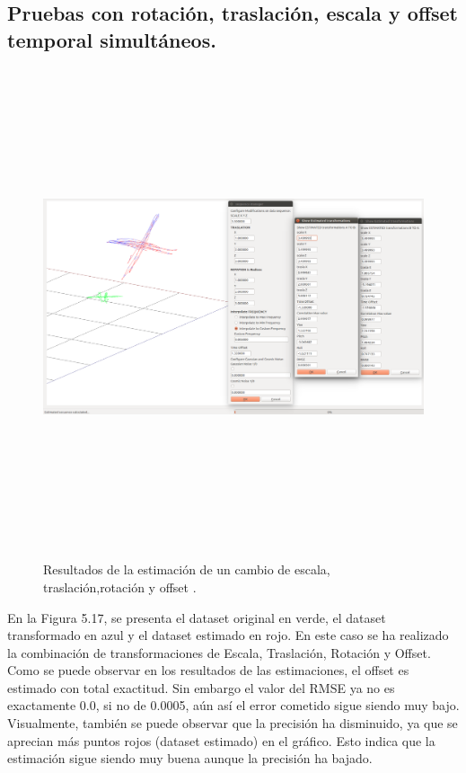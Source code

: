 \subsection{Pruebas con rotación, traslación, escala y offset temporal simultáneos.}
\begin{figure}[H]
\begin{center}
\label{fig:opciones de View}\includegraphics[height=14.0cm,width=18.0cm]{img/cap6/Escala_Trasla_Rota_Offset_abba.png}
\hspace{0.5cm}

\end{center}

\caption{Resultados de la estimación de un cambio de escala, traslación,rotación y offset .}
\end{figure}

En la Figura 5.17, se presenta el dataset original en verde, el dataset transformado en azul y el dataset estimado en rojo.
En este caso se ha realizado la combinación de transformaciones de Escala, Traslación, Rotación y Offset.
Como se puede observar en los resultados de las estimaciones, el offset es estimado con total exactitud. Sin embargo el valor del RMSE ya no es exactamente 0.0, si no de 0.0005, aún así el error cometido sigue siendo muy bajo.
Visualmente, también se puede observar que la precisión ha disminuido, ya que se aprecian más puntos rojos (dataset estimado) en el gráfico. Esto indica que la estimación sigue siendo muy buena aunque la precisión ha bajado.



